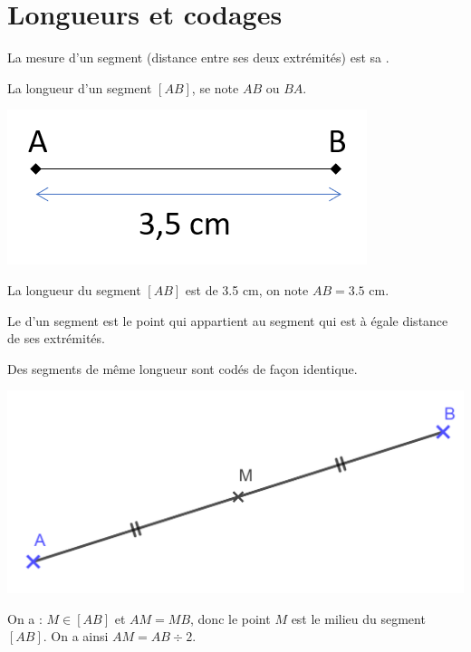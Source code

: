 \documentclass[xcolor={dvipsnames}]{beamer}
\begin{document}
\section{Longueurs et codages}


\begin{frame}
	\begin{mydefs}
		La mesure d'un segment \pause (distance entre ses deux extrémités) \pause est sa . \pause
		
		La longueur d'un segment $[AB]$, \pause se note $AB$ ou $BA$. \pause
	\end{mydefs}
	
		
	\begin{myex}
		
		\begin{center}
			\includegraphics[scale=0.6]{../img/lgr}\pause
		\end{center}
		
		La longueur du segment $[AB]$ est de \num{3.5} cm, \pause on note $AB =\num{3.5}$ cm.
	\end{myex}
\end{frame}


\begin{frame}
	\begin{mydef}
		Le  d'un segment \pause est le point qui appartient au segment  \pause qui est à égale distance de ses extrémités.\pause
	\end{mydef}
	
	\begin{myrem}
		Des segments de même longueur sont codés de façon identique.\pause
	\end{myrem}
	
	\begin{myex}
		\begin{center}
			\includegraphics[scale=0.2]{../img/milieu}
		\end{center}
		
		On a : \pause $M \in [AB]$ et $AM = MB$, \pause donc le point $M$ est le milieu du segment $[AB]$. \pause On a ainsi $AM = AB \div 2$. 
	\end{myex}
\end{frame}
\end{document}
